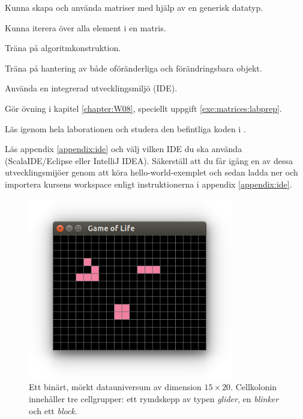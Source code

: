 
\Lab{\LabWeekEIGHT}

\begin{Goals}
\item Kunna skapa och använda matriser med hjälp av en generisk datatyp.
\item Kunna iterera över alla element i en matris.
\item Träna på algoritmkonstruktion.
\item Träna på hantering av både oföränderliga och förändringsbara objekt.
\item Använda en integrerad utvecklingsmiljö (IDE).
\end{Goals}

\begin{Preparations}
\item Gör övning {\tt \ExeWeekEIGHT} i kapitel \ref{chapter:W08}, speciellt uppgift \ref{exe:matrices:labprep}.

\item Läs igenom hela laborationen och studera den befintliga koden i \TODO {}.

\item Läs appendix \ref{appendix:ide} och välj vilken IDE du ska använda (ScalaIDE/Eclipse eller IntelliJ IDEA). Säkerställ att du får igång en av dessa utvecklingsmijöer genom att köra hello-world-exemplet och sedan ladda ner och importera kursens \TODO workspace enligt instruktionerna i appendix \ref{appendix:ide}.
\end{Preparations}


\begin{figure}[H]
  \includegraphics[width=0.8\textwidth]{../img/glider-blinker-block}

  \vspace{-2em}\caption{\label{lab:life:glider-blinker-block}Ett binärt, mörkt datauniversum av dimension $15  \times 20$. Cellkolonin innehåller tre cellgrupper: ett rymdskepp av typen \emph{glider}, en \emph{blinker} och ett \emph{block}.}
\end{figure}


